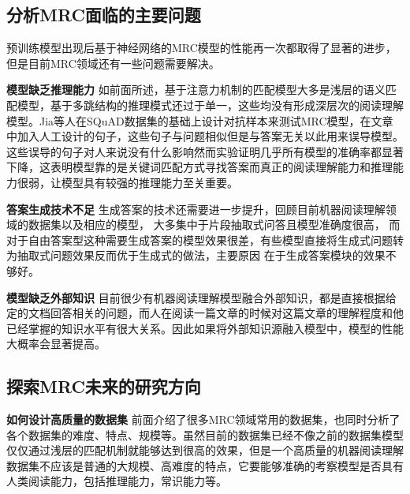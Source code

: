 




\subsection{分析MRC面临的主要问题}
预训练模型出现后基于神经网络的MRC模型的性能再一次都取得了显著的进步，但是目前MRC领域还有一些问题需要解决。

\textbf{模型缺乏推理能力} \quad
如前面所述，基于注意力机制的匹配模型大多是浅层的语义匹配模型，基于多跳结构的推理模式还过于单一，这些均没有形成深层次的阅读理解模型。Jia等人在SQuAD数据集的基础上设计对抗样本来测试MRC模型，在文章中加入人工设计的句子，这些句子与问题相似但是与答案无关以此用来误导模型。这些误导的句子对人来说没有什么影响然而实验证明几乎所有模型的准确率都显著下降，这表明模型靠的是关键词匹配方式寻找答案而真正的阅读理解能力和推理能力很弱，让模型具有较强的推理能力至关重要。

\textbf{答案生成技术不足} \quad
生成答案的技术还需要进一步提升，回顾目前机器阅读理解领域的数据集以及相应的模型，
大多集中于片段抽取式问答且模型准确度很高，
而对于自由答案型这种需要生成答案的模型效果很差，有些模型直接将生成式问题转为抽取式问题效果反而优于生成式的做法，主要原因
在于生成答案模块的效果不够好。

\textbf{模型缺乏外部知识} \quad
目前很少有机器阅读理解模型融合外部知识，都是直接根据给定的文档回答相关的问题，而人在阅读一篇文章的时候对这篇文章的理解程度和他已经掌握的知识水平有很大关系。因此如果将外部知识源融入模型中，模型的性能大概率会显著提高。

\subsection{探索MRC未来的研究方向}

\textbf{如何设计高质量的数据集} \quad
前面介绍了很多MRC领域常用的数据集，也同时分析了各个数据集的难度、特点、规模等。虽然目前的数据集已经不像之前的数据集模型仅仅通过浅层的匹配机制就能够达到很高的效果，但是一个高质量的机器阅读理解数据集不应该是普通的大规模、高难度的特点，它要能够准确的考察模型是否具有人类阅读能力，包括推理能力，常识能力等。

